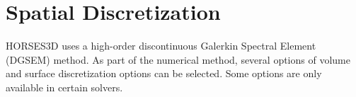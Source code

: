 \documentclass[a4paper,10pt]{report}
\begin{document}
%
%
%
%
%
%
%
%


\chapter{Spatial Discretization}

HORSES3D uses a high-order discontinuous Galerkin Spectral Element (DGSEM) method. As part of the numerical method, several options of volume and surface discretization options can be selected. Some options are only available in certain solvers.
\end{document}
